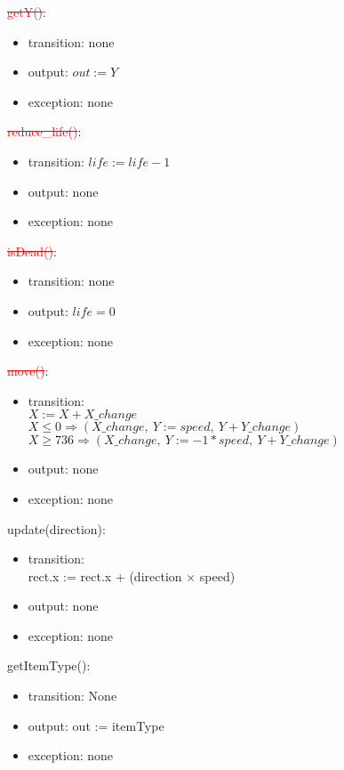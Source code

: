 \documentclass[12pt]{article}
\begin{document}
\noindent \textcolor{red}{\st{getY()}}:
\begin{itemize}
\item transition: none
\item output: $out := Y$
\item exception: none
\end{itemize}

\noindent \textcolor{red}{\st{reduce\_life()}}:
\begin{itemize}
\item transition: $life := life - 1$
\item output: none
\item exception: none
\end{itemize}

\noindent \textcolor{red}{\st{isDead()}}:
\begin{itemize}
\item transition: none
\item output: $life = 0$
\item exception: none
\end{itemize}

\noindent \textcolor{red}{\st{move()}}:
\begin{itemize}
\item transition: \\
$X := X + X\_change$\\
$X \leq 0 \Rightarrow (X\_change,\ Y  := speed,\ Y + Y\_change)$\\
$X \geq 736 \Rightarrow (X\_change,\ Y  := -1*speed,\ Y + Y\_change)$
\item output: none
\item exception: none
\end{itemize}


\noindent update(direction):
\begin{itemize}
\item transition: \\
rect.x := rect.x + (direction $\times$ speed)
\item output: none
\item exception: none
\end{itemize}

\noindent getItemType():
\begin{itemize}
\item transition: None
\item output: out := itemType
\item exception: none
\end{itemize}
\end{document}
